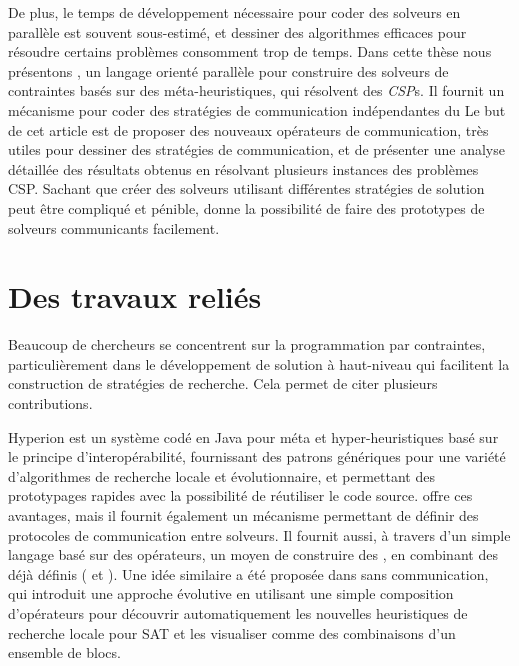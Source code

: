 De plus, le temps de d\'eveloppement n\'ecessaire pour coder des solveurs en parall\`ele est souvent sous-estim\'e, et dessiner des algorithmes efficaces pour r\'esoudre certains probl\`emes consomment trop de temps. Dans cette th\`ese nous pr\'esentons \posl{}, un langage orient\'e parall\`ele pour construire des solveurs de contraintes bas\'es sur des m\'eta-heuristiques, qui r\'esolvent des {\it CSP}s. Il fournit un m\'ecanisme pour coder des strat\'egies de communication ind\'ependantes du Le but de cet article est de proposer des nouveaux op\'erateurs de communication, tr\`es utiles pour dessiner des strat\'egies de communication, et de pr\'esenter une analyse d\'etaill\'ee des r\'esultats obtenus en r\'esolvant plusieurs instances des probl\`emes CSP. Sachant que cr\'eer des solveurs utilisant diff\'erentes strat\'egies de solution peut \^etre compliqu\'e et p\'enible, \posl{} donne la possibilit\'e de faire des prototypes de solveurs communicants facilement.  

\section {Des travaux reli\'es}

Beaucoup de chercheurs se concentrent sur la programmation par contraintes, particuli\`erement dans le d\'eveloppement de solution \`a haut-niveau qui facilitent la construction de strat\'egies de recherche. Cela permet de citer plusieurs contributions. 

{\sc Hyperion} \cite{Brownlee2014} est un syst\`eme cod\'e en Java pour m\'eta et hyper-heuristiques bas\'e sur le principe d'interop\'erabilit\'e, fournissant des patrons g\'en\'eriques pour une vari\'et\'e d'algorithmes de recherche locale et \'evolutionnaire, et permettant des prototypages rapides avec la possibilit\'e de r\'eutiliser le code source. \posl{} offre ces avantages, mais il fournit \'egalement un m\'ecanisme permettant de d\'efinir des protocoles de communication entre solveurs. Il fournit aussi, \`a travers d'un simple langage bas\'e sur des op\'erateurs, un moyen de construire des \ass, en combinant des \ms{} d\'ej\`a d\'efinis (\oms{} et \opchs). Une id\'ee similaire a \'et\'e propos\'ee dans \cite{Fukunaga2008} sans communication, qui introduit une approche \'evolutive en utilisant une simple composition d'op\'erateurs pour d\'ecouvrir automatiquement les nouvelles heuristiques de recherche locale pour SAT et les visualiser comme des combinaisons d'un ensemble de blocs.

